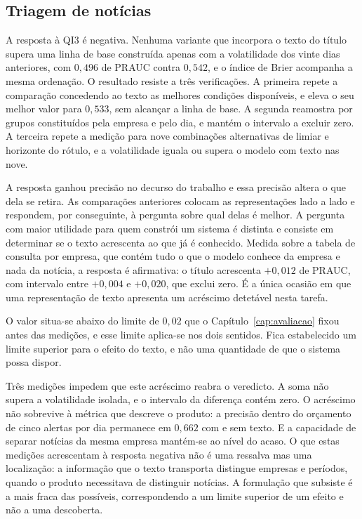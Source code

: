 \subsection{Triagem de notícias}

A resposta à \gls{QI}3 é negativa. Nenhuma variante que incorpora o texto do título supera uma linha
de base construída apenas com a volatilidade dos vinte dias anteriores, com $0{,}496$ de \gls{PRAUC}
contra $0{,}542$, e o índice de Brier acompanha a mesma ordenação. O resultado resiste a três verificações. A primeira repete a comparação concedendo ao texto as
melhores condições disponíveis, e eleva o seu melhor valor para $0{,}533$, sem alcançar a linha de
base. A segunda reamostra por grupos constituídos pela empresa e pelo dia, e mantém o intervalo a
excluir zero. A terceira repete a medição para nove combinações alternativas de limiar e horizonte
do rótulo, e a volatilidade iguala ou supera o modelo com texto nas nove.

A resposta ganhou precisão no decurso do trabalho e essa precisão altera o que dela se retira. As
comparações anteriores colocam as representações lado a lado e respondem, por conseguinte, à pergunta
sobre qual delas é melhor. A pergunta com maior utilidade para quem constrói um sistema é distinta e
consiste em determinar se o texto acrescenta ao que já é conhecido. Medida sobre a tabela de consulta
por empresa, que contém tudo o que o modelo conhece da empresa e nada da notícia, a resposta é
afirmativa: o título acrescenta $+0{,}012$ de \gls{PRAUC}, com intervalo entre $+0{,}004$ e
$+0{,}020$, que exclui zero. É a única ocasião em que uma representação de texto apresenta um
acréscimo detetável nesta tarefa.

O valor situa-se abaixo do limite de $0{,}02$ que o Capítulo~\ref{cap:avaliacao} fixou antes das
medições, e esse limite aplica-se nos dois sentidos. Fica estabelecido um limite superior para o
efeito do texto, e não uma quantidade de que o sistema possa dispor.

Três medições impedem que este acréscimo reabra o veredicto. A soma não supera a volatilidade isolada, e o intervalo da diferença contém zero. O acréscimo não
sobrevive à métrica que descreve o produto: a precisão dentro do orçamento de cinco alertas por
dia permanece em $0{,}662$ com e sem texto. E a capacidade de separar notícias da mesma empresa
mantém-se ao nível do acaso. O que estas medições acrescentam à resposta negativa não é uma ressalva mas uma localização: a
informação que o texto transporta distingue empresas e períodos, quando o produto necessitava de
distinguir notícias. A formulação que subsiste é a mais fraca das possíveis, correspondendo a um
limite superior de um efeito e não a uma descoberta.

